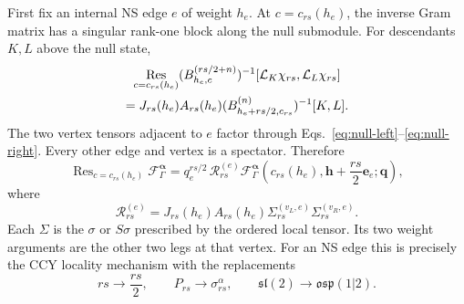 \documentclass[11pt]{article}
\newcommand{\osp}{\mathfrak{osp}(1|2)}
\newcommand{\F}{\mathcal F}
\newcommand{\ve}{\bm e}
\DeclareMathOperator{\Res}{Res}
\begin{document}
First fix an internal NS edge $e$ of weight $h_e$.  At
$c=c_{rs}(h_e)$, the inverse Gram matrix has a singular rank-one block along
the null submodule.  For descendants $K,L$ above the null state,
\begin{multline}
 \Res_{c=c_{rs}(h_e)}
 (B_{h_e,c}^{(rs/2+n)})^{-1}
 [\mathcal L_K\chi_{rs},\mathcal L_L\chi_{rs}]
 \notag\\
 =J_{rs}(h_e)A_{rs}(h_e)
 (B_{h_e+rs/2,c_{rs}}^{(n)})^{-1}[K,L].
 \label{eq:gram-residue}
\end{multline}
The two vertex tensors adjacent to $e$ factor through
Eqs.~\eqref{eq:null-left}--\eqref{eq:null-right}.  Every other edge and
vertex is a spectator.  Therefore
\begin{equation}
 \Res_{c=c_{rs}(h_e)}\F_{\Gamma}^{\boldsymbol\alpha}
 =q_e^{rs/2}\,\mathcal R_{rs}^{(e)}
 \F_{\Gamma}^{\boldsymbol\alpha}
 \left(c_{rs}(h_e),
       \boldsymbol h+\frac{rs}{2}\ve_e;
       \boldsymbol q\right),
 \label{eq:edge-residue}
\end{equation}
where
\begin{equation}
 \mathcal R_{rs}^{(e)}
 =J_{rs}(h_e)A_{rs}(h_e)
 \Sigma_{rs}^{(v_L,e)}\Sigma_{rs}^{(v_R,e)}.
 \label{eq:edge-r}
\end{equation}
Each $\Sigma$ is the $\sigma$ or $S\sigma$ prescribed by the ordered local
tensor.  Its two weight arguments are the other two legs at that vertex.
For an NS edge this is precisely the CCY locality mechanism with the
replacements
\begin{equation}
 rs\longrightarrow \frac{rs}{2},
 \qquad P_{rs}\longrightarrow\sigma_{rs}^{\alpha},
 \qquad \mathfrak{sl}(2)\longrightarrow\osp.
 \label{eq:replacement-rule}
\end{equation}
\end{document}
